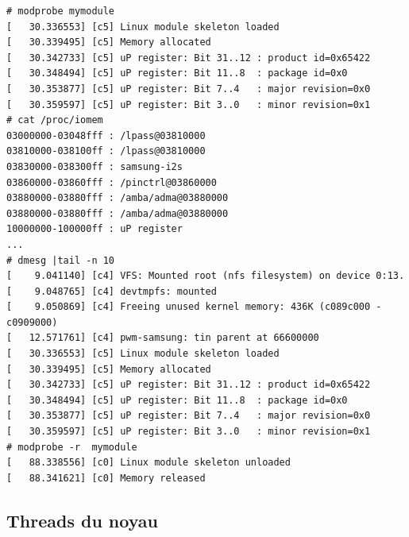 \begin{lstlisting}
# modprobe mymodule                                                             
[   30.336553] [c5] Linux module skeleton loaded                                
[   30.339495] [c5] Memory allocated                                            
[   30.342733] [c5] uP register: Bit 31..12 : product id=0x65422                
[   30.348494] [c5] uP register: Bit 11..8  : package id=0x0                    
[   30.353877] [c5] uP register: Bit 7..4   : major revision=0x0                
[   30.359597] [c5] uP register: Bit 3..0   : minor revision=0x1                
# cat /proc/iomem                                                               
03000000-03048fff : /lpass@03810000                                             
03810000-038100ff : /lpass@03810000                                             
03830000-038300ff : samsung-i2s                                                 
03860000-03860fff : /pinctrl@03860000                                           
03880000-03880fff : /amba/adma@03880000                                         
03880000-03880fff : /amba/adma@03880000                                      
10000000-100000ff : uP register                                                 
...                                             
# dmesg |tail -n 10                                                             
[    9.041140] [c4] VFS: Mounted root (nfs filesystem) on device 0:13.          
[    9.048765] [c4] devtmpfs: mounted                                           
[    9.050869] [c4] Freeing unused kernel memory: 436K (c089c000 - c0909000)    
[   12.571761] [c4] pwm-samsung: tin parent at 66600000                         
[   30.336553] [c5] Linux module skeleton loaded                                
[   30.339495] [c5] Memory allocated                                            
[   30.342733] [c5] uP register: Bit 31..12 : product id=0x65422                
[   30.348494] [c5] uP register: Bit 11..8  : package id=0x0                    
[   30.353877] [c5] uP register: Bit 7..4   : major revision=0x0                
[   30.359597] [c5] uP register: Bit 3..0   : minor revision=0x1                
# modprobe -r  mymodule                                                         
[   88.338556] [c0] Linux module skeleton unloaded                              
[   88.341621] [c0] Memory released    
\end{lstlisting}

\subsection{Threads du noyau}
